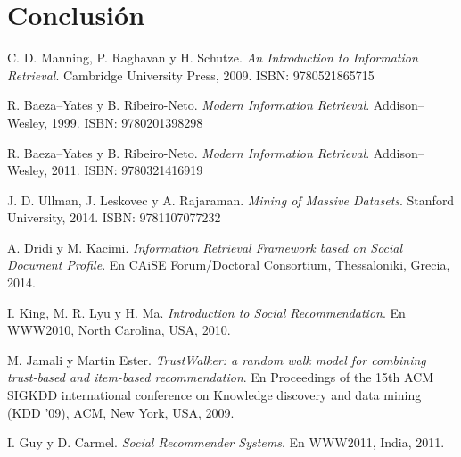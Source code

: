 \documentclass[11pt, spanish]{report}
\begin{document}
	\chapter{Conclusión}
		
	
		
	\begin{thebibliography}{56}
		
  			C. D. Manning, P. Raghavan y H. Schutze.
  			\textit{An Introduction to Information Retrieval}.
  			Cambridge University Press, 
  			2009. ISBN: 9780521865715
  		
  			R. Baeza--Yates y B. Ribeiro-Neto.
  			\textit{Modern Information Retrieval}.
  			Addison--Wesley, 
  			1999. ISBN: 9780201398298
  			
  			R. Baeza--Yates y B. Ribeiro-Neto.
  			\textit{Modern Information Retrieval}.
  			Addison--Wesley, 
  			2011. ISBN: 9780321416919
  		
  			J. D. Ullman, J. Leskovec y A. Rajaraman.
  			\textit{Mining of Massive Datasets}.
  			Stanford University, 
  			2014. ISBN: 9781107077232
  			
  			A. Dridi y M. Kacimi. 
  			\textit{Information Retrieval Framework based on Social Document Profile}. 
  			En CAiSE Forum/Doctoral Consortium, Thessaloniki, Grecia, 2014.
  		
  			I. King, M. R. Lyu y H. Ma. 
  			\textit{Introduction to Social Recommendation}. 
  			En WWW2010, North Carolina, USA, 2010.

  			M. Jamali y Martin Ester. 
  			\textit{TrustWalker: a random walk model for combining trust-based and item-based recommendation}. 
  			En Proceedings of the 15th ACM SIGKDD international conference on Knowledge discovery and data mining (KDD '09), ACM, New York, USA, 2009.
  			
  			I. Guy y D. Carmel. 
  			\textit{Social Recommender Systems}. 
  			En WWW2011, India, 2011.
  			

\end{thebibliography}
\end{document}
